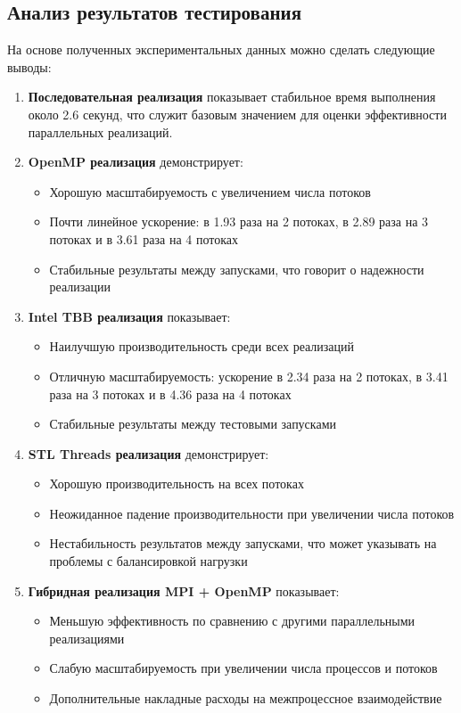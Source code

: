 \documentclass[12pt]{article}
\begin{document}
\subsection{Анализ результатов тестирования}
На основе полученных экспериментальных данных можно сделать следующие выводы:
\begin{enumerate}
\item \textbf{Последовательная реализация} показывает стабильное время выполнения около 2.6 секунд, что служит базовым значением для оценки эффективности параллельных реализаций.
\item \textbf{OpenMP реализация} демонстрирует:
\begin{itemize}
\item Хорошую масштабируемость с увеличением числа потоков
\item Почти линейное ускорение: в 1.93 раза на 2 потоках, в 2.89 раза на 3 потоках и в 3.61 раза на 4 потоках
\item Стабильные результаты между запусками, что говорит о надежности реализации
\end{itemize}
\item \textbf{Intel TBB реализация} показывает:
\begin{itemize}
\item Наилучшую производительность среди всех реализаций
\item Отличную масштабируемость: ускорение в 2.34 раза на 2 потоках, в 3.41 раза на 3 потоках и в 4.36 раза на 4 потоках
\item Стабильные результаты между тестовыми запусками
\end{itemize}
\item \textbf{STL Threads реализация} демонстрирует:
\begin{itemize}
\item Хорошую производительность на всех потоках
\item Неожиданное падение производительности при увеличении числа потоков
\item Нестабильность результатов между запусками, что может указывать на проблемы с балансировкой нагрузки
\end{itemize}
\item \textbf{Гибридная реализация MPI + OpenMP} показывает:
\begin{itemize}
\item Меньшую эффективность по сравнению с другими параллельными реализациями
\item Слабую масштабируемость при увеличении числа процессов и потоков
\item Дополнительные накладные расходы на межпроцессное взаимодействие
\end{itemize}
\end{enumerate}
\end{document}
